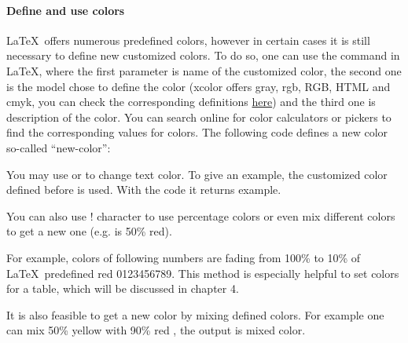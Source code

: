 	\paragraph{Define and use colors}
	
	\LaTeX~offers numerous predefined colors, however in certain cases it is still necessary to define new customized colors. To do so, one can use the {\color{blue}{\verb|\definecolor|}} command in \LaTeX, where the first parameter is name of the customized color, the second one is the model chose to define the color (xcolor offers gray, rgb, RGB, HTML and cmyk, you can check the corresponding definitions \href{https://en.wikibooks.org/wiki/LaTeX/Colors#Color_Models}{here}) and the third one is description of the color. You can search online for color calculators or pickers to find the corresponding values for colors. The following code defines a new color so-called ``new-color'':
	
	{}
	
	You may use {} or {\color{blue}{\color{blue}{\verb|\textcolor{color}{text}|}}} to change text color. To give an example, the customized color defined before is used. With the code {} it returns {\color{new-color}example}. 
	
	You can also use ! character to use percentage colors or even mix different colors to get a new one (e.g. {\color{blue}{\color{blue}{\verb|red!50|}}} is 50\% red). 
	
	For example, colors of following numbers are fading from 100\% to 10\% of \LaTeX~predefined red {\color{red!100}0}{\color{red!90}1}{\color{red!80}2}{\color{red!70}3}{\color{red!60}4}{\color{red!50}5}{\color{red!40}6}{\color{red!30}7}{\color{red!20}8}{\color{red!10}9}. This method is especially helpful to set colors for a table, which will be discussed in chapter 4.
	
	It is also feasible to get a new color by mixing defined colors. For example one can mix 50\% yellow with 90\% red {}, the output is {\color{yellow!60!red!90}mixed color}.
	
